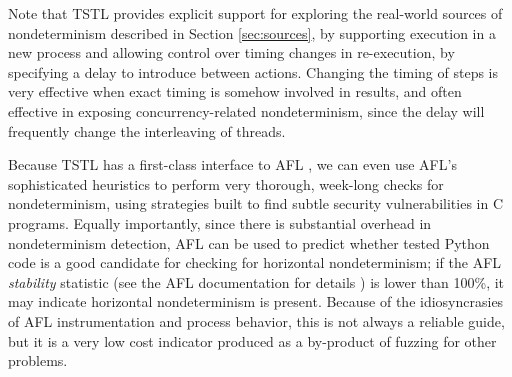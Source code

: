 \begin{comment}
 Tables \ref{tab:methods}
and \ref{tab:options} show, respectively, the primary additions to the
TSTL Python API and the TSTL command line tools; in addition to
horizontal nondeterminism checking, these extensions also support failure
nondeterminism and probabilistic delta-debugging.  The TSTL test
generation tool is called {\tt rt}, since the default mode is a fast
pure Random Tester, and {\tt reduce} is TSTL's tool for
delta-debugging and test
normalization (more aggressive reduction that also tends to ease
debugging and test triage by making tests failing due to the same
fault more similar \cite{onetest}).  With these additions,
developers of TSTL-based testing tools, or developers using TSTL tools
to test code can easily add nondeterminism to the set of properties
checked.  It is even possible to write a TSTL harness that
automatically checks itself for nondeterminism, even if the random
tester is not run with {\tt --checkDeterminism}, simply by adding:

{\scriptsize
\begin{code}
property: not self.nondeterministic(self.test())
\end{code}
}

\noindent to the harness; in fact, by removing the {\tt not}, a test harness can
even specify that behavior should not be deterministic, a property of
possible use in some security-related libraries.

\end{comment}

Note that TSTL provides explicit support for exploring the real-world sources of
nondeterminism described in Section \ref{sec:sources}, by supporting
execution in a new process and allowing
control over timing changes in re-execution, by specifying a delay to
introduce between actions.  Changing the timing of
steps is very effective when exact timing is somehow involved in
results, and often effective in exposing concurrency-related
nondeterminism, since the delay will frequently change the
interleaving of threads.

Because TSTL has a first-class interface to AFL \cite{aflfuzz}, we can even use
AFL's sophisticated heuristics to perform very thorough, week-long
checks for nondeterminism, using strategies built to find subtle
security vulnerabilities in C programs.  Equally importantly, since
there is substantial overhead in nondeterminism detection, AFL can be
used to predict whether tested Python code is a good candidate for
checking for horizontal nondeterminism; if the
AFL \emph{stability} statistic (see the AFL documentation for details
\cite{aflfuzz}) is lower than 100\%, it may indicate horizontal
nondeterminism is present.
Because of the idiosyncrasies of AFL instrumentation and process
behavior, this is not always a reliable guide, but it is a very low
cost indicator produced as a by-product of fuzzing for other problems.

